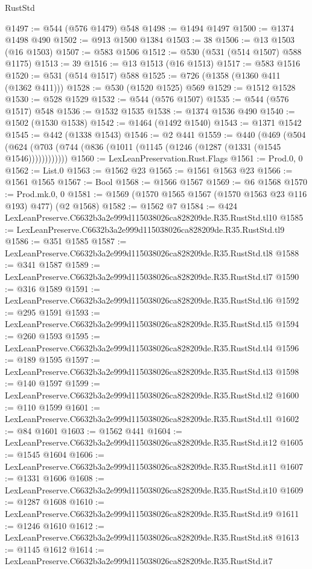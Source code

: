 \begin{lexlean}{RustStd}
\begin{coremodule}
@1497 := @544 (@576 @1479) @548
@1498 := @1494 @1497
@1500 := @1374 @1498 @490
@1502 := @913 @1500 @1384
@1503 := 38
@1506 := @13 @1503 (@16 @1503)
@1507 := @583 @1506
@1512 := @530 (@531 (@514 @1507) @588 @1175)
@1513 := 39
@1516 := @13 @1513 (@16 @1513)
@1517 := @583 @1516
@1520 := @531 (@514 @1517) @588
@1525 := @726 (@1358 (@1360 @411 (@1362 @411)))
@1528 := @530 (@1520 @1525) @569
@1529 := @1512 @1528
@1530 := @528 @1529
@1532 := @544 (@576 @1507)
@1535 := @544 (@576 @1517) @548
@1536 := @1532 @1535
@1538 := @1374 @1536 @490
@1540 := @1502 (@1530 @1538)
@1542 := @1464 (@1492 @1540)
@1543 := @1371 @1542
@1545 := @442 (@1338 @1543)
@1546 := @2 @441
@1559 := @440
    (@469 (@504 (@624 (@703 (@744 (@836 (@1011 (@1145 (@1246 (@1287 (@1331 (@1545 @1546))))))))))))
@1560 := LexLeanPreservation.Rust.Flags
@1561 := Prod.{0, 0}
@1562 := List.{0}
@1563 := @1562 @23
@1565 := @1561 @1563 @23
@1566 := @1561 @1565
@1567 := Bool
@1568 := @1566 @1567
@1569 := @6 @1568
@1570 := Prod.mk.{0, 0}
@1581 := @1569 (@1570 @1565 @1567 (@1570 @1563 @23 @116 @193) @477) (@2 @1568)
@1582 := @1562 @7
@1584 := @424 LexLeanPreserve.C6632b3a2e999d115038026ca828209de.R35.RustStd.tl10
@1585 := LexLeanPreserve.C6632b3a2e999d115038026ca828209de.R35.RustStd.tl9
@1586 := @351 @1585
@1587 := LexLeanPreserve.C6632b3a2e999d115038026ca828209de.R35.RustStd.tl8
@1588 := @341 @1587
@1589 := LexLeanPreserve.C6632b3a2e999d115038026ca828209de.R35.RustStd.tl7
@1590 := @316 @1589
@1591 := LexLeanPreserve.C6632b3a2e999d115038026ca828209de.R35.RustStd.tl6
@1592 := @295 @1591
@1593 := LexLeanPreserve.C6632b3a2e999d115038026ca828209de.R35.RustStd.tl5
@1594 := @260 @1593
@1595 := LexLeanPreserve.C6632b3a2e999d115038026ca828209de.R35.RustStd.tl4
@1596 := @189 @1595
@1597 := LexLeanPreserve.C6632b3a2e999d115038026ca828209de.R35.RustStd.tl3
@1598 := @140 @1597
@1599 := LexLeanPreserve.C6632b3a2e999d115038026ca828209de.R35.RustStd.tl2
@1600 := @110 @1599
@1601 := LexLeanPreserve.C6632b3a2e999d115038026ca828209de.R35.RustStd.tl1
@1602 := @84 @1601
@1603 := @1562 @441
@1604 := LexLeanPreserve.C6632b3a2e999d115038026ca828209de.R35.RustStd.it12
@1605 := @1545 @1604
@1606 := LexLeanPreserve.C6632b3a2e999d115038026ca828209de.R35.RustStd.it11
@1607 := @1331 @1606
@1608 := LexLeanPreserve.C6632b3a2e999d115038026ca828209de.R35.RustStd.it10
@1609 := @1287 @1608
@1610 := LexLeanPreserve.C6632b3a2e999d115038026ca828209de.R35.RustStd.it9
@1611 := @1246 @1610
@1612 := LexLeanPreserve.C6632b3a2e999d115038026ca828209de.R35.RustStd.it8
@1613 := @1145 @1612
@1614 := LexLeanPreserve.C6632b3a2e999d115038026ca828209de.R35.RustStd.it7

\end{coremodule}
\end{lexlean}
